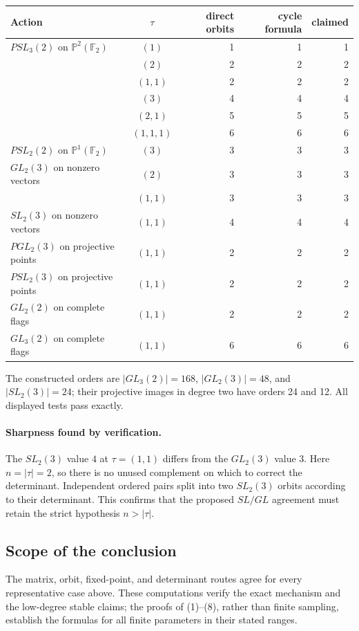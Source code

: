 \documentclass[10pt]{article}
\newcommand{\F}{\mathbb F}
\begin{document}
\begin{center}
\small
\begin{tabular}{@{}lcrrr@{}}
\toprule
Action & $\tau$ & direct orbits & cycle formula & claimed\\
\midrule
$PSL_3(2)$ on $\mathbb P^2(\F_2)$ & $(1)$ & 1&1&1\\
 & $(2)$ &2&2&2\\
 & $(1,1)$ &2&2&2\\
 & $(3)$ &4&4&4\\
 & $(2,1)$ &5&5&5\\
 & $(1,1,1)$ &6&6&6\\
$PSL_2(2)$ on $\mathbb P^1(\F_2)$ & $(3)$ &3&3&3\\
$GL_2(3)$ on nonzero vectors & $(2)$ &3&3&3\\
 & $(1,1)$ &3&3&3\\
$SL_2(3)$ on nonzero vectors & $(1,1)$ &4&4&4\\
$PGL_2(3)$ on projective points & $(1,1)$ &2&2&2\\
$PSL_2(3)$ on projective points & $(1,1)$ &2&2&2\\
$GL_2(2)$ on complete flags & $(1,1)$ &2&2&2\\
$GL_3(2)$ on complete flags & $(1,1)$ &6&6&6\\
\bottomrule
\end{tabular}
\end{center}

The constructed orders are $|GL_3(2)|=168$, $|GL_2(3)|=48$, and
$|SL_2(3)|=24$; their projective images in degree two have orders 24 and 12.
All displayed tests pass exactly.

\paragraph{Sharpness found by verification.}
The $SL_2(3)$ value $4$ at $\tau=(1,1)$ differs from the $GL_2(3)$ value
$3$.  Here $n=|\tau|=2$, so there is no unused complement on which to correct
the determinant.  Independent ordered pairs split into two $SL_2(3)$ orbits
according to their determinant.  This confirms that the proposed $SL/GL$
agreement must retain the strict hypothesis $n>|\tau|$.

\subsection{Scope of the conclusion}
The matrix, orbit, fixed-point, and determinant routes agree for every
representative case above.  These computations verify the exact mechanism and
the low-degree stable claims; the proofs of (1)--(8), rather than finite
sampling, establish the formulas for all finite parameters in their stated
ranges.
\endgroup
\end{document}
